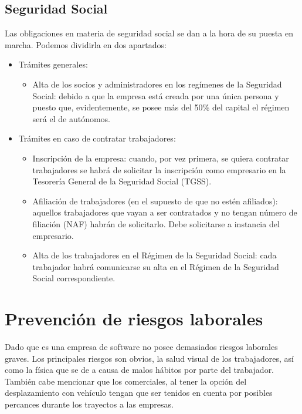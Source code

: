 \documentclass[12pt, a4paper]{book} %
\begin{document}
			\subsection{Seguridad Social}
			Las obligaciones en materia de seguridad social se dan a la hora de su puesta en marcha. Podemos dividirla en dos apartados:
			\begin{itemize}
				\item Trámites generales:
				\begin{itemize}
					\item Alta de los socios y administradores en los regímenes de la Seguridad Social: debido a que la empresa está creada por una única persona y puesto que, evidentemente, se posee más del 50\% del capital el régimen será el de autónomos.
				\end{itemize}
				\item Trámites en caso de contratar trabajadores:
				\begin{itemize}
					\item Inscripción de la empresa: cuando, por vez primera, se quiera contratar trabajadores se habrá de solicitar la inscripción como empresario en la Tesorería General de la Seguridad Social (TGSS).
					\item Afiliación de trabajadores (en el supuesto de que no estén afiliados): aquellos trabajadores que vayan a ser contratados y no tengan número de filiación (NAF) habrán de solicitarlo. Debe solicitarse a instancia del empresario.
					\item Alta de los trabajadores en el Régimen de la Seguridad Social: cada trabajador habrá comunicarse su alta en el Régimen de la Seguridad Social correspondiente.
				\end{itemize}
			\end{itemize}
			
		\section{Prevención de riesgos laborales}
		Dado que es una empresa de software no posee demasiados riesgos laborales graves. Los principales riesgos son obvios, la salud visual de los trabajadores, así como la física que se de a causa de malos hábitos por parte del trabajador. También cabe mencionar que los comerciales, al tener la opción del desplazamiento con vehículo tengan que ser tenidos en cuenta por posibles percances durante los trayectos a las empresas.
\end{document}
